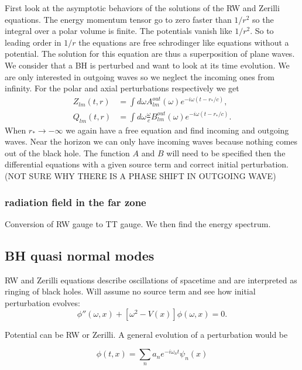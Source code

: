 \documentclass[12 pt]{article}
\begin{document}
First look at the asymptotic behaviors of the solutions of the RW and Zerilli equations. The energy momentum tensor go to zero faster than $1/r^2$ so the integral over a polar volume is finite. The potentials vanish like $1/r^2$. So to leading order in $1/r$ the equations are free schrodinger like equations without a potential. The solution for this equation are thus a superposition of plane waves. 
We consider that a BH is perturbed and want to look at its time evolution. We are only interested in outgoing waves so we neglect the incoming ones from infinity. For the polar and axial perturbations respectively we get
\begin{align}
	Z_{lm}(t,r) &= \int d\omega A_{lm}^{out}(\omega) e^{-i \omega (t-r_*/c)}, \\
	Q_{lm}(t,r) &= \int d\omega \frac{\omega}{c} B_{lm}^{out}(\omega) e^{-i \omega (t-r_*/c)}.
\end{align}
When $r_* \longrightarrow -\infty$ we again have a free equation and find incoming and outgoing waves. Near the horizon we can only have incoming waves because nothing comes out of the black hole. The function $A$ and $B$ will need to be specified then the differential equations with a given source term and correct initial perturbation. (NOT SURE WHY THERE IS A PHASE SHIFT IN OUTGOING WAVE)

\subsubsection{radiation field in the far zone}

Conversion of RW gauge to TT gauge. We then find the energy spectrum. 

\subsection{BH quasi normal modes}

RW and Zerilli equations describe oscillations of spacetime and are interpreted as ringing of black holes.
Will assume no source term and see how initial perturbation evolves:
\begin{equation}
	\phi''(\omega, x) + [\omega^2 -V(x)]\phi(\omega,x) = 0.
\end{equation}

Potential can be RW or Zerilli. A general evolution of a perturbation would be 

\begin{equation}
	\phi(t,x) = \sum_n a_n e^{-i\omega_n t } \psi_n(x) 
\end{equation}
\end{document}
